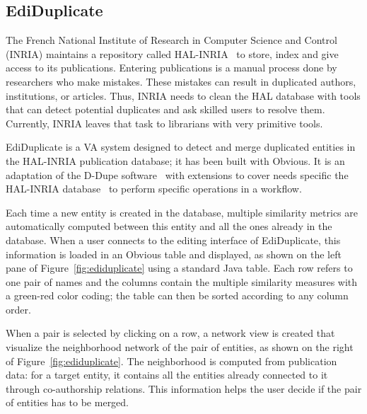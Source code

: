 \subsection{EdiDuplicate}

The French National Institute of Research in Computer Science and
Control (INRIA) maintains a repository called HAL-INRIA~\cite{HAL} to
store, index and give access to its publications.  Entering
publications is a manual process done by researchers who make
mistakes.  These mistakes can result in duplicated authors,
institutions, or articles. Thus, INRIA needs to clean the HAL database
with tools that can detect potential duplicates and ask skilled users
to resolve them.  Currently, INRIA leaves that task to librarians with
very primitive tools.

EdiDuplicate is a VA system designed to detect and merge duplicated
entities in the HAL-INRIA publication database; it has been built
with Obvious.  It is an adaptation of the D-Dupe software~\cite{DDupe}
with extensions to cover needs specific the HAL-INRIA
database~\cite{HAL} to perform specific operations in a workflow.

Each time a new entity is created in the database, multiple similarity
metrics are automatically computed between this entity and all the ones
already in the database.  When a user connects to the editing
interface of EdiDuplicate, this information is loaded in an Obvious
table and displayed, as shown on the left pane of
Figure~\ref{fig:ediduplicate} using a standard Java table.  Each row
refers to one pair of names and the columns contain the multiple
similarity measures with a green-red color coding; the table can
then be sorted according to any column order.

When a pair is selected by clicking on a row, a network view is created
that visualize the neighborhood network of the pair of entities, as
shown on the right of Figure~\ref{fig:ediduplicate}.  The
neighborhood is computed from publication data: for a target entity,
it contains all the entities already connected to it through
co-authorship relations.  This information helps the user decide if
the pair of entities has to be merged.

